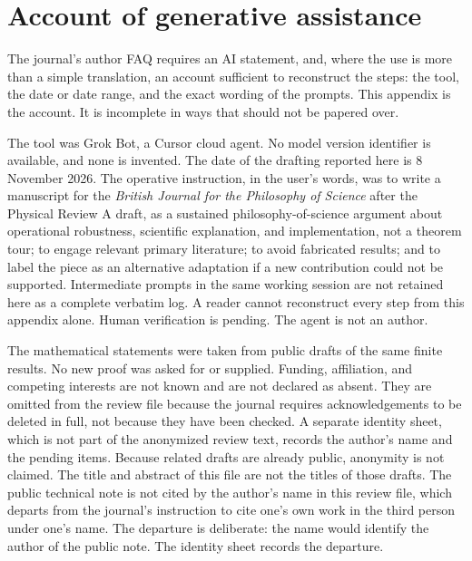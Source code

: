 \documentclass[12pt]{article}
\begin{document}
\appendix
\section{Account of generative assistance}
\label{app:ai}

The journal's author FAQ requires an AI statement, and, where the use is more than a simple translation, an account sufficient to reconstruct the steps: the tool, the date or date range, and the exact wording of the prompts. This appendix is the account. It is incomplete in ways that should not be papered over.

The tool was Grok Bot, a Cursor cloud agent. No model version identifier is available, and none is invented. The date of the drafting reported here is 8 November 2026. The operative instruction, in the user's words, was to write a manuscript for the \emph{British Journal for the Philosophy of Science} after the Physical Review A draft, as a sustained philosophy-of-science argument about operational robustness, scientific explanation, and implementation, not a theorem tour; to engage relevant primary literature; to avoid fabricated results; and to label the piece as an alternative adaptation if a new contribution could not be supported. Intermediate prompts in the same working session are not retained here as a complete verbatim log. A reader cannot reconstruct every step from this appendix alone. Human verification is pending. The agent is not an author.

The mathematical statements were taken from public drafts of the same finite results. No new proof was asked for or supplied. Funding, affiliation, and competing interests are not known and are not declared as absent. They are omitted from the review file because the journal requires acknowledgements to be deleted in full, not because they have been checked. A separate identity sheet, which is not part of the anonymized review text, records the author's name and the pending items. Because related drafts are already public, anonymity is not claimed. The title and abstract of this file are not the titles of those drafts. The public technical note is not cited by the author's name in this review file, which departs from the journal's instruction to cite one's own work in the third person under one's name. The departure is deliberate: the name would identify the author of the public note. The identity sheet records the departure.
\end{document}
